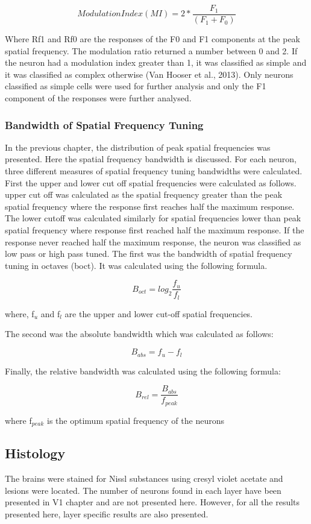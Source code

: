 				\[Modulation Index (MI)= 2*\frac{F_1}{(F_1+F_0)}\]
				
				Where Rf1 and Rf0 are the responses of the F0 and F1 components at the peak spatial frequency.
				The modulation ratio returned a number between 0 and 2. If the neuron had a modulation index greater than 1, it was classified as simple and it was classified as complex otherwise (Van Hooser et al., 2013). Only neurons classified as simple cells were used for further analysis and only the F1 component of the responses were further analysed.
				
				\subsubsection{Bandwidth of Spatial Frequency Tuning}
				In the previous chapter, the distribution of peak spatial frequencies was presented. Here the spatial frequency bandwidth is discussed. For each neuron, three different measures of spatial frequency tuning bandwidths were calculated. First the upper and lower cut off spatial frequencies were calculated as follows. upper cut off was calculated as the spatial frequency greater than the peak spatial frequency where the response first reaches half the maximum response. The lower cutoff was calculated similarly for spatial frequencies lower than peak spatial frequency where response first reached half the maximum response. If the response never reached half the maximum response, the neuron was classified as low pass or high pass tuned. The first was the bandwidth of spatial frequency tuning in octaves (boct). It was calculated using the following formula.
				
				\[B_{oct}=log_2\frac{f_u}{f_l}\]
				
				where, f$_u$ and f$_l$ are the upper and lower cut-off spatial frequencies.
				
				The second was the absolute bandwidth which was calculated as follows:
				
				\[B_{abs}=f_u-f_l\]
				
				Finally, the relative bandwidth was calculated using the following formula:
				
				\[B_{rel}=\frac{B_{abs}}{f_{peak}}\]
				
				where f$_{peak}$ is the optimum spatial frequency of the neurons
								
		\subsection{Histology}
				The brains were stained for Nissl substances using cresyl violet acetate and lesions were located. The number of neurons found in each layer have been presented in V1 chapter and are not presented here. However, for all the results presented here, layer specific results are also presented.
							

